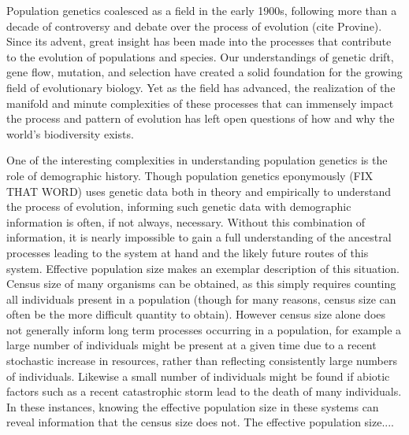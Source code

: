 


Population genetics coalesced as a field in the early 1900s, following more than a decade of controversy and debate over the process of evolution (cite Provine). Since its advent, great insight has been made into the processes that contribute to the evolution of populations and species. Our understandings of genetic drift, gene flow, mutation, and selection have created a solid foundation for the growing field of evolutionary biology. Yet as the field has advanced, the realization of the manifold and minute complexities of these processes that can  immensely impact the process and pattern of evolution has left open questions of how and why the world's biodiversity exists.

One of the interesting complexities in understanding population genetics is the role of demographic history. Though population genetics eponymously (FIX THAT WORD) uses genetic data both in theory and empirically to understand the process of evolution, informing such genetic data with demographic information is often, if not always, necessary. Without this combination of information, it is nearly impossible to gain a full understanding of the ancestral processes leading to the system at hand and the likely future routes of this system. Effective population size makes an exemplar description of this situation. Census size of many organisms can be obtained, as this simply requires counting all individuals present in a population (though for many reasons, census size can often be the more difficult quantity to obtain). However census size alone does not generally inform long term processes occurring in a population, for example a large number of individuals might be present at a given time due to a recent stochastic increase in resources, rather than reflecting consistently large numbers of individuals. Likewise a small number of individuals might be found if abiotic factors such as a recent catastrophic storm lead to the death of many individuals. In these instances, knowing the effective population size in these systems can reveal information that the census size does not. The effective population size....

